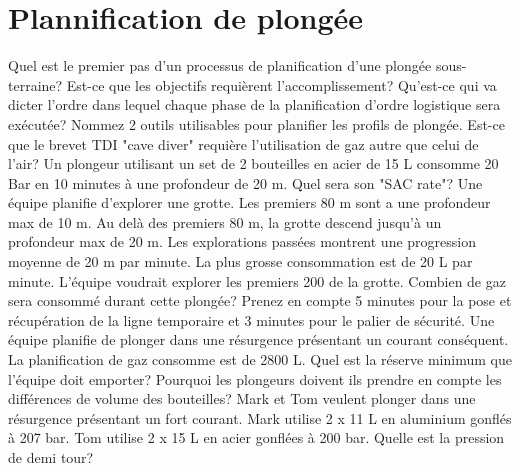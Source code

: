 \documentclass[english,1pt,a4paper]{article}
\begin{document}
	\pagebreak	

	\section{Plannification de plongée}

	\begin{outline}
		\1 Quel est le premier pas d’un processus de planification d’une plongée sous-terraine?	\vspace{2cm}
		\1 Est-ce que les objectifs requièrent l’accomplissement?	\vspace{2cm}
		\1 Qu’est-ce qui va dicter l’ordre dans lequel chaque phase de la planification d’ordre logistique sera exécutée?	\vspace{2cm}
		\1 Nommez 2 outils utilisables pour planifier les profils de plongée.	\vspace{2cm}
		\1 Est-ce que le brevet TDI "cave diver" requière l’utilisation de gaz autre que celui de l’air?	\vspace{2cm}
		\1 Un plongeur utilisant un set de 2 bouteilles en acier de 15 L consomme 20 Bar en 10 minutes à une profondeur de 20 m. Quel sera son "SAC rate"?	\vspace{2cm}
		\1 Une équipe planifie d’explorer une grotte. Les premiers 80 m sont a une profondeur max de 10 m. Au delà des premiers 80 m, la grotte descend jusqu'à un profondeur max de 20 m.  Les explorations passées montrent une progression moyenne de 20 m par minute. La plus grosse consommation est de 20 L par minute. L’équipe voudrait explorer les premiers 200 de la grotte. Combien de gaz sera consommé durant cette plongée? Prenez en compte 5 minutes pour la pose et récupération de la ligne temporaire et 3 minutes pour le palier de sécurité.	\vspace{2cm}
		\1 Une équipe planifie de plonger dans une résurgence présentant un courant conséquent. La planification de gaz consomme est de 2800 L. Quel est la réserve minimum que l’équipe doit emporter?	\vspace{2cm}
		\1 Pourquoi les plongeurs doivent ils prendre en compte les différences de volume des bouteilles?	\vspace{2cm}
		\1 Mark et Tom veulent plonger dans une résurgence présentant un fort courant. Mark utilise 2 x 11 L en aluminium gonflés à 207 bar. Tom utilise 2 x 15 L en acier gonflées à 200 bar. Quelle est la pression de demi tour?	\vspace{2cm}

\end{outline}
\end{document}
